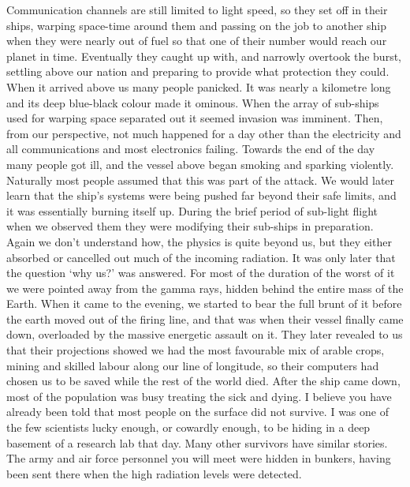 \documentclass[a4paper]{article}
\begin{document}
Communication channels are still limited to light speed, so they set off in their ships, warping space-time around them and passing on the job to another ship when they were nearly out of fuel so that one of their number would reach our planet in time. Eventually they caught up with, and narrowly overtook the burst, settling above our nation and preparing to provide what protection they could.
When it arrived above us many people panicked. It was nearly a kilometre long and its deep blue-black colour made it ominous. When the array of sub-ships used for warping space separated out it seemed invasion was imminent. Then, from our perspective, not much happened for a day other than the electricity and all communications and most electronics failing. Towards the end of the day many people got ill, and the vessel above began smoking and sparking violently.
Naturally most people assumed that this was part of the attack. We would later learn that the ship’s systems were being pushed far beyond their safe limits, and it was essentially burning itself up. During the brief period of sub-light flight when we observed them they were modifying their sub-ships in preparation. Again we don’t understand how, the physics is quite beyond us, but they either absorbed or cancelled out much of the incoming radiation.
It was only later that the question ‘why us?’ was answered. For most of the duration of the worst of it we were pointed away from the gamma rays, hidden behind the entire mass of the Earth. When it came to the evening, we started to bear the full brunt of it before the earth moved out of the firing line, and that was when their vessel finally came down, overloaded by the massive energetic assault on it. They later revealed to us that their projections showed we had the most favourable mix of arable crops, mining and skilled labour along our line of longitude, so their computers had chosen us to be saved while the rest of the world died.
After the ship came down, most of the population was busy treating the sick and dying. I believe you have already been told that most people on the surface did not survive. I was one of the few scientists lucky enough, or cowardly enough, to be hiding in a deep basement of a research lab that day. Many other survivors have similar stories. The army and air force personnel you will meet were hidden in bunkers, having been sent there when the high radiation levels were detected.
\end{document}
